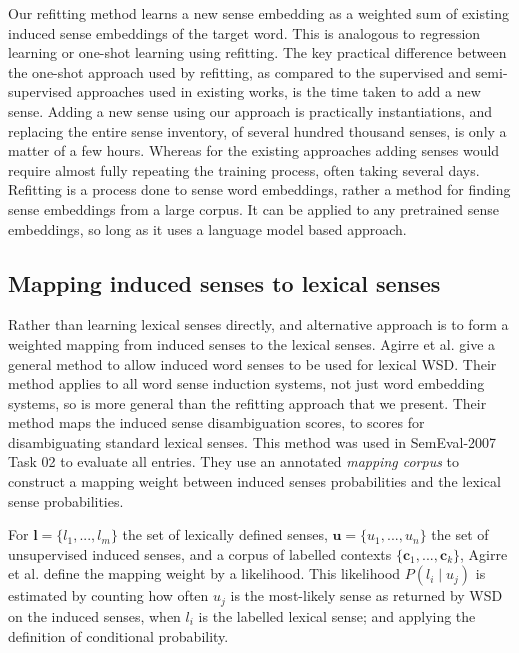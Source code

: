 \documentclass{article} %
\def\parencite{\cite} %
\renewcommand{\c}{\mathbf{c}}
\renewcommand{\l}{\mathbf{l}}
\renewcommand{\u}{\mathbf{u}}
\providecommand{\DIFaddbegin}{} %
\providecommand{\DIFaddend}{} %
\providecommand{\DIFdelbegin}{} %
\providecommand{\DIFdelend}{} %
\begin{document}
Our refitting method learns a new sense embedding as a weighted sum of existing induced sense embeddings of the target word.
This is analogous to regression learning or one-shot learning using refitting.
The key practical difference between the one-shot approach used by refitting, as compared to the supervised and semi-supervised approaches used in existing works, is the time taken to  add a new sense.
Adding a new sense using our approach is practically instantiations, and replacing the entire sense inventory, of several hundred thousand senses, is only a matter of a few hours.
Whereas for the existing approaches adding senses would require almost fully repeating the training process, often taking several days.
Refitting is a process done to sense word embeddings, rather a method for finding sense embeddings from a large corpus. 
It can be applied to any pretrained sense embeddings, so long as it uses a language model based approach.



\subsection{Mapping induced senses to lexical senses}\label{mapping}
Rather than learning lexical senses directly, and alternative approach is to form a weighted mapping from induced senses to the lexical senses.
 Agirre et al. \DIFdelbegin %
\DIFdelend \DIFaddbegin {} \DIFaddend give a general method to allow induced word senses to be used for lexical WSD.
Their method applies to all word sense induction systems, not just word embedding systems, so is more general than the refitting approach that we present.
Their method maps the induced sense disambiguation scores, to scores for disambiguating standard lexical senses. This method was used in SemEval-2007 Task 02 \parencite{SemEval2007WSIandWSD} to evaluate all entries.
They use an annotated \emph{mapping corpus} to construct a mapping weight between induced senses probabilities and the lexical sense probabilities.

For $\l=\{l_1,..., l_m\}$ the set of lexically defined senses, $\u=\{u_1,...,u_n\}$ the set of unsupervised induced senses, and a corpus of labelled contexts $\{\c_1, ...,\c_k\}$, Agirre et al. define the mapping weight by a likelihood.
This likelihood $P(l_i \mid u_j)$ is estimated by counting how often $u_j$ is the most-likely sense as returned by WSD on the induced senses, when $l_i$ is the labelled lexical sense; and applying the definition of conditional probability.
\end{document}
